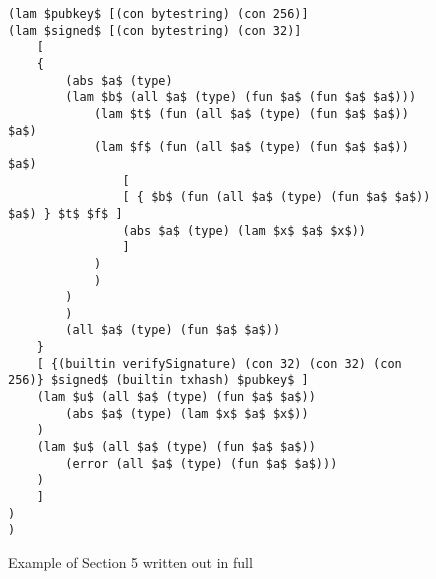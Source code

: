 \documentclass[../plutus-core-specification.tex]{subfiles}
\begin{document}
\begin{figure*}[h]  %
\begin{lstlisting}[basicstyle=\ttfamily,mathescape]
(lam $pubkey$ [(con bytestring) (con 256)]
(lam $signed$ [(con bytestring) (con 32)]
    [ 
    {
        (abs $a$ (type)
        (lam $b$ (all $a$ (type) (fun $a$ (fun $a$ $a$)))
            (lam $t$ (fun (all $a$ (type) (fun $a$ $a$)) $a$)
            (lam $f$ (fun (all $a$ (type) (fun $a$ $a$)) $a$)
                [
                [ { $b$ (fun (all $a$ (type) (fun $a$ $a$)) $a$) } $t$ $f$ ]
                (abs $a$ (type) (lam $x$ $a$ $x$))
                ]
            )
            )
        )
        )
        (all $a$ (type) (fun $a$ $a$))
    }
    [ {(builtin verifySignature) (con 32) (con 32) (con 256)} $signed$ (builtin txhash) $pubkey$ ]
    (lam $u$ (all $a$ (type) (fun $a$ $a$))
        (abs $a$ (type) (lam $x$ $a$ $x$))
    )
    (lam $u$ (all $a$ (type) (fun $a$ $a$))
        (error (all $a$ (type) (fun $a$ $a$)))
    )
    ]
)
)
\end{lstlisting}
\caption{Example of Section 5 written out in full}
\label{fig:Continuized_Let_Example}
\end{figure*}
\end{document}
